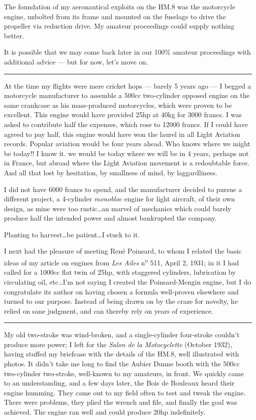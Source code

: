 \documentclass{book}
\newcommand*\sectline{
  \vspace{5pt}
  \begin{center}
    \rule{0.5\linewidth}{\linethickness}
  \end{center}
  \vspace{5pt}
}
\begin{document}
The foundation of my aeronautical exploits on the HM.8 was the motorcycle engine, unbolted from its frame and mounted on the fuselage to drive the propeller via reduction drive.  My amateur proceedings could supply nothing better.

It is possible that we may come back later in our 100\% amateur
proceedings with additional advice --- but for now, let's move on.

\sectline

At the time my flights were mere cricket hops --- barely 5 years ago
--- I begged a motorcycle manufacturer to assemble a 500cc
two-cylinder opposed engine on the same crankcase as his mass-produced
motorcycles, which were proven to be excellent.  This engine would
have provided 25hp at 40kg for 3000 francs.  I was asked to contribute
half the expenses, which rose to 12000 francs.  If I could have agreed
to pay half, this engine would have won the laurel in all Light
Aviation records.  Popular aviation would be four years ahead.  Who
knows where we might be today!!  I know it.  we would be today where
we will be in 4 years, perhaps not in France, but abroad where the
Light Aviation movement is a redoubtable force.  And all that lost by
hesitation, by smallness of mind, by laggardliness.

I did not have 6000 francs to spend, and the manufacturer decided to
pursue a different project, a 4-cylinder \textit{monobloc} engine for
light aircraft, of their own design, as mine were too rustic\ldots an
marvel of mechanics which could barely produce half the intended power
and almost bankrupted the company.

Planting to harvest\ldots be patient\ldots I stuck to it.

I next had the pleasure of meeting Ren\'e Poinsard, to whom I related
the basic ideas of my article on engines from \textit{Les Ailes}
n\textsuperscript{o} 511, April 2, 1931; in it I had called for a
1000cc flat twin of 25hp, with staggered cylinders, lubrication by
circulating oil, etc\ldots I'm not saying I created the
Poinsard-Mengin engine, but I do congratulate its author on having
chosen a formula well-proven elsewhere and turned to our purpose.
Instead of being drawn on by the craze for novelty, he relied on sane
judgment, and can thereby rely on years of experience.

\sectline

My old two-stroke was wind-broken, and a single-cylinder four-stroke
couldn't produce more power; I left for the \textit{Salon de la
  Motocyclette} (October 1932), having stuffed my briefcase with the
details of the HM.8, well illustrated with photos.  It didn't take me
long to find the Aubier Dunne booth with the 500cc two-cylinder
two-stroke, well-known to my amateurs, in front.  We quickly came to
an understanding, and a few days later, the Bois de Bouleaux heard
their engine humming.  They came out to my field often to test and
tweak the engine.  There were problems, they plied the wrench and
file, and finally the goal was achieved.  The engine ran well and
could produce 20hp indefinitely.
\end{document}
